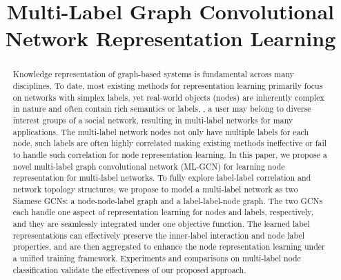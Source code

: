 \documentclass[conference]{IEEEtran}
\begin{document}
\title{Multi-Label Graph Convolutional Network Representation Learning}

\author{
}

\maketitle

\begin{abstract}
Knowledge representation of graph-based systems is fundamental across many disciplines. To date, most existing methods for representation learning primarily focus on networks with simplex labels, yet real-world objects (nodes) are inherently complex in nature and often contain rich semantics or labels, , a user may belong to diverse interest groups of a social network, resulting in multi-label networks for many applications. The multi-label network nodes not only have multiple labels for each node, such labels are often highly correlated making existing methods ineffective or fail to handle such correlation for node representation learning. In this paper, we propose a novel multi-label graph convolutional network (ML-GCN) for learning node representation for multi-label networks. To fully explore label-label correlation and network topology structures, we propose to model a multi-label network as two Siamese GCNs: a node-node-label graph and a label-label-node graph. The two GCNs each handle one aspect of representation learning for nodes and labels, respectively, and they are seamlessly integrated under one objective function. The learned label representations can effectively preserve the inner-label interaction and node label properties, and are then aggregated to enhance the node representation learning under a unified training framework. Experiments and comparisons on multi-label node classification validate the effectiveness of our proposed approach.

\end{abstract}
\end{document}

